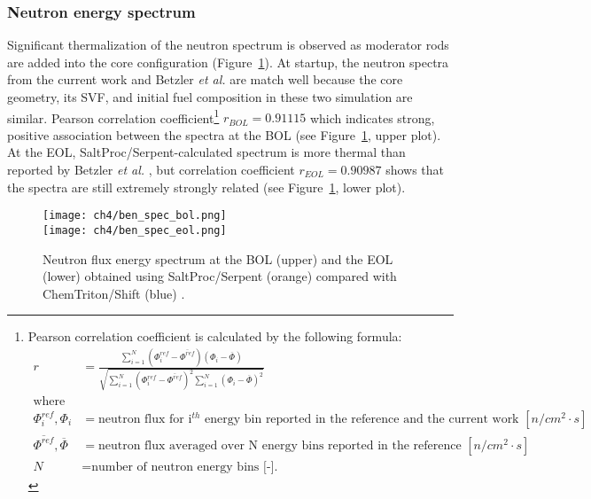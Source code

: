 \subsubsection{Neutron energy spectrum}
Significant thermalization of the neutron spectrum is observed as moderator 
rods are added into the core configuration 
(Figure~\ref{fig:ben-spectrum-bol}). At startup, the neutron spectra from the 
current work and Betzler \emph{et al.} are match well because the core 
geometry, its \gls{SVF}, and initial fuel composition in 
these two simulation are similar. Pearson correlation  
coefficient\footnote{Pearson correlation coefficient is calculated by the 
	following formula:
	\begin{align}
	r &= \frac{\sum_{i=1}^{N} 
		(\Phi_i^{ref}-\overline{\Phi^{ref}})(\Phi_i-\overline{\Phi})}
	{\sqrt{\sum_{i=1}^{N} (\Phi_i^{ref}-\overline{\Phi^{ref}})^2 
			\sum_{i=1}^{N} 
			(\Phi_i-\overline{\Phi})^2}}\\
	\mbox{where} \nonumber\\
	\Phi_i^{ref},\Phi_i &= \mbox{neutron flux for i$^{th}$ energy bin 
		reported in the reference and the current work $[n/cm^2\cdot s]$} 
	\nonumber\\
	\overline{\Phi^{ref}}, \overline{\Phi} &= \mbox{neutron flux averaged over 
		N energy bins reported in the reference and current work $[n/cm^2\cdot 
		s]$} 
	\nonumber\\
	N &= \mbox{number of neutron energy bins [-].}
	\nonumber
	\end{align}}
$r_{BOL}=0.91115$ which indicates strong, positive association between the 
spectra at the \gls{BOL} (see Figure~\ref{fig:ben-spectrum-bol}, upper plot).
At the \gls{EOL}, SaltProc/Serpent-calculated spectrum is more thermal than 
reported by Betzler \emph{et al.} \cite{betzler_assessment_2017-1}, but 
correlation coefficient $r_{EOL}=0.90987$ shows that the spectra are still 
extremely strongly related (see Figure~\ref{fig:ben-spectrum-bol}, lower 
plot). 
\begin{figure}[htbp!] %
	\centering
	\texttt{[image: ch4/ben\_spec\_bol.png]}\\
	\vspace{-12mm}
	\hspace{0.5mm}
	\texttt{[image: ch4/ben\_spec\_eol.png]}
	\vspace{-3mm}
	\caption{Neutron flux energy spectrum at the BOL (upper) and the EOL 
		(lower) obtained using SaltProc/Serpent (orange) compared with 
		ChemTriton/Shift (blue) \cite{betzler_assessment_2017-1}.}
	\label{fig:ben-spectrum-bol}
\end{figure}



